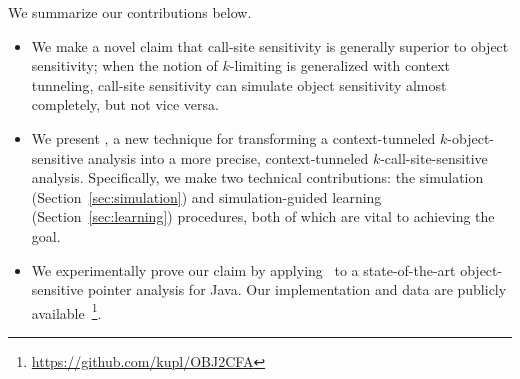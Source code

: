 


 We summarize our contributions below.
\begin{itemize}[leftmargin=1.3em]
\item %

We make a novel claim that call-site sensitivity is generally superior to object sensitivity; when the notion of $k$-limiting is
  generalized with context tunneling, call-site sensitivity can simulate object sensitivity almost completely, but not vice versa.

\item %
	We present \ourtechnique, a new technique for transforming a
context-tunneled $k$-object-sensitive analysis into a more precise, context-tunneled
  $k$-call-site-sensitive analysis. %
  Specifically, we make two technical contributions: the simulation (Section~\ref{sec:simulation}) and simulation-guided learning (Section~\ref{sec:learning}) procedures, both of which are vital to achieving the goal. 

\item %
We experimentally prove our claim by applying \ourtechnique~to a
  state-of-the-art object-sensitive pointer analysis for Java. 
Our implementation and data are publicly available~\footnote{\url{https://github.com/kupl/OBJ2CFA}}.
\end{itemize}	





